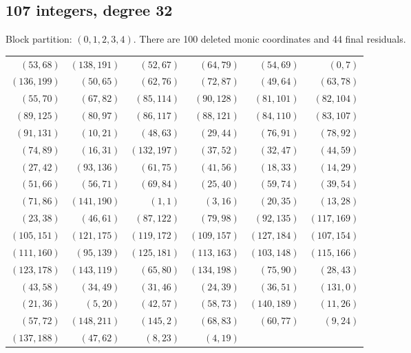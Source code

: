 \subsection{107 integers, degree 32}
Block partition: $(0,1,2,3,4)$.
There are 100 deleted monic coordinates and 44 final residuals.
\begin{center}\small\begin{tabular}{rrrrrr}\toprule
$(53,68)$ & $(138,191)$ & $(52,67)$ & $(64,79)$ & $(54,69)$ & $(0,7)$\\
$(136,199)$ & $(50,65)$ & $(62,76)$ & $(72,87)$ & $(49,64)$ & $(63,78)$\\
$(55,70)$ & $(67,82)$ & $(85,114)$ & $(90,128)$ & $(81,101)$ & $(82,104)$\\
$(89,125)$ & $(80,97)$ & $(86,117)$ & $(88,121)$ & $(84,110)$ & $(83,107)$\\
$(91,131)$ & $(10,21)$ & $(48,63)$ & $(29,44)$ & $(76,91)$ & $(78,92)$\\
$(74,89)$ & $(16,31)$ & $(132,197)$ & $(37,52)$ & $(32,47)$ & $(44,59)$\\
$(27,42)$ & $(93,136)$ & $(61,75)$ & $(41,56)$ & $(18,33)$ & $(14,29)$\\
$(51,66)$ & $(56,71)$ & $(69,84)$ & $(25,40)$ & $(59,74)$ & $(39,54)$\\
$(71,86)$ & $(141,190)$ & $(1,1)$ & $(3,16)$ & $(20,35)$ & $(13,28)$\\
$(23,38)$ & $(46,61)$ & $(87,122)$ & $(79,98)$ & $(92,135)$ & $(117,169)$\\
$(105,151)$ & $(121,175)$ & $(119,172)$ & $(109,157)$ & $(127,184)$ & $(107,154)$\\
$(111,160)$ & $(95,139)$ & $(125,181)$ & $(113,163)$ & $(103,148)$ & $(115,166)$\\
$(123,178)$ & $(143,119)$ & $(65,80)$ & $(134,198)$ & $(75,90)$ & $(28,43)$\\
$(43,58)$ & $(34,49)$ & $(31,46)$ & $(24,39)$ & $(36,51)$ & $(131,0)$\\
$(21,36)$ & $(5,20)$ & $(42,57)$ & $(58,73)$ & $(140,189)$ & $(11,26)$\\
$(57,72)$ & $(148,211)$ & $(145,2)$ & $(68,83)$ & $(60,77)$ & $(9,24)$\\
$(137,188)$ & $(47,62)$ & $(8,23)$ & $(4,19)$ &  & \\
\bottomrule\end{tabular}\end{center}
\clearpage
